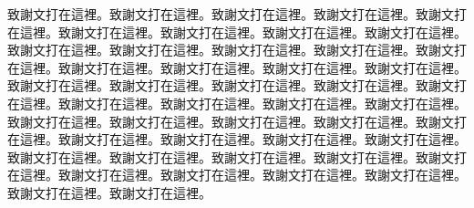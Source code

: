 
\begin{acknowledgement}

  致謝文打在這裡。致謝文打在這裡。致謝文打在這裡。致謝文打在這裡。致謝文打在這裡。致謝文打在這裡。致謝文打在這裡。致謝文打在這裡。致謝文打在這裡。致謝文打在這裡。致謝文打在這裡。致謝文打在這裡。致謝文打在這裡。致謝文打在這裡。致謝文打在這裡。致謝文打在這裡。致謝文打在這裡。致謝文打在這裡。致謝文打在這裡。致謝文打在這裡。致謝文打在這裡。致謝文打在這裡。致謝文打在這裡。致謝文打在這裡。致謝文打在這裡。致謝文打在這裡。致謝文打在這裡。致謝文打在這裡。致謝文打在這裡。致謝文打在這裡。致謝文打在這裡。致謝文打在這裡。致謝文打在這裡。致謝文打在這裡。致謝文打在這裡。致謝文打在這裡。致謝文打在這裡。致謝文打在這裡。致謝文打在這裡。致謝文打在這裡。致謝文打在這裡。致謝文打在這裡。致謝文打在這裡。致謝文打在這裡。致謝文打在這裡。致謝文打在這裡。致謝文打在這裡。

\end{acknowledgement}